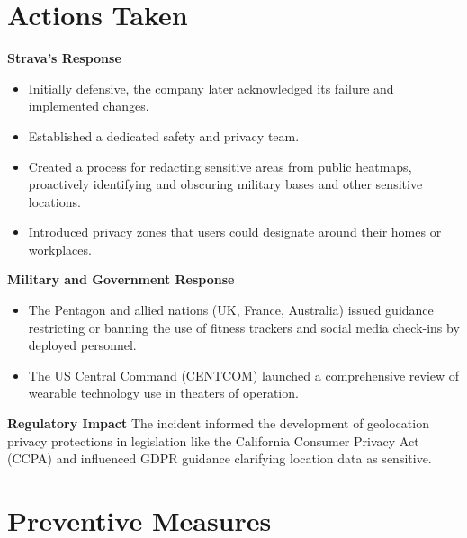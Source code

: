 \documentclass{article}
\begin{document}
\section{Actions Taken}
\textbf{Strava's Response}
\begin{itemize}

\item Initially defensive, the company later acknowledged its failure and implemented changes.

\item Established a dedicated safety and privacy team.

\item  Created a process for redacting sensitive areas from public heatmaps, proactively identifying and obscuring military bases and other sensitive locations.

\item Introduced privacy zones that users could designate around their homes or workplaces.
\end{itemize}
\textbf{Military and Government Response}
\begin{itemize}

\item The Pentagon and allied nations (UK, France, Australia) issued guidance restricting or banning the use of fitness trackers and social media check-ins by deployed personnel.

\item The US Central Command (CENTCOM) launched a comprehensive review of wearable technology use in theaters of operation.
\end{itemize}
\textbf{Regulatory Impact}
The incident informed the development of geolocation privacy protections in legislation like the California Consumer Privacy Act (CCPA) and influenced GDPR guidance clarifying location data as sensitive.

\section{Preventive Measures}
\end{document}
